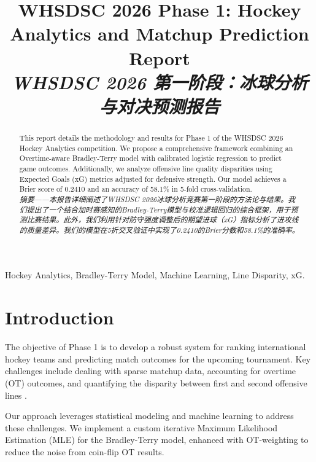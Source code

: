 \documentclass[conference]{IEEEtran}
\begin{document}
\title{WHSDSC 2026 Phase 1: Hockey Analytics and Matchup Prediction Report \\
\textit{WHSDSC 2026 第一阶段：冰球分析与对决预测报告}}

\author{
}

\maketitle

\begin{abstract}
This report details the methodology and results for Phase 1 of the WHSDSC 2026 Hockey Analytics competition. We propose a comprehensive framework combining an Overtime-aware Bradley-Terry model with calibrated logistic regression to predict game outcomes. Additionally, we analyze offensive line quality disparities using Expected Goals (xG) metrics adjusted for defensive strength. Our model achieves a Brier score of 0.2410 and an accuracy of 58.1\% in 5-fold cross-validation.
\\
\textit{摘要——本报告详细阐述了WHSDSC 2026冰球分析竞赛第一阶段的方法论与结果。我们提出了一个结合加时赛感知的Bradley-Terry模型与校准逻辑回归的综合框架，用于预测比赛结果。此外，我们利用针对防守强度调整后的期望进球（xG）指标分析了进攻线的质量差异。我们的模型在5折交叉验证中实现了0.2410的Brier分数和58.1\%的准确率。}
\end{abstract}

\begin{IEEEkeywords}
Hockey Analytics, Bradley-Terry Model, Machine Learning, Line Disparity, xG.
\end{IEEEkeywords}

\section{Introduction}
\label{sec:intro}
The objective of Phase 1 is to develop a robust system for ranking international hockey teams and predicting match outcomes for the upcoming tournament. Key challenges include dealing with sparse matchup data, accounting for overtime (OT) outcomes, and quantifying the disparity between first and second offensive lines \cite{whsdsc2026}.

Our approach leverages statistical modeling and machine learning to address these challenges. We implement a custom iterative Maximum Likelihood Estimation (MLE) for the Bradley-Terry model, enhanced with OT-weighting to reduce the noise from coin-flip OT results.
\end{document}
